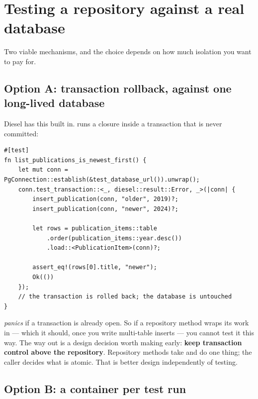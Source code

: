 \section{Testing a repository against a real database}

Two viable mechanisms, and the choice depends on how much isolation you want to pay for.

\subsection{Option A: transaction rollback, against one long-lived database}

Diesel has this built in.  runs a closure inside a transaction
that is never committed:

\begin{lstlisting}[style=rs,caption={Fast, no containers, no cleanup.}]
#[test]
fn list_publications_is_newest_first() {
    let mut conn = PgConnection::establish(&test_database_url()).unwrap();
    conn.test_transaction::<_, diesel::result::Error, _>(|conn| {
        insert_publication(conn, "older", 2019)?;
        insert_publication(conn, "newer", 2024)?;

        let rows = publication_items::table
            .order(publication_items::year.desc())
            .load::<PublicationItem>(conn)?;

        assert_eq!(rows[0].title, "newer");
        Ok(())
    });
    // the transaction is rolled back; the database is untouched
}
\end{lstlisting}

\begin{pitfall}
 \emph{panics} if a transaction is already open. So if a repository
method wraps its work in  --- which it should, once you write
multi-table inserts --- you cannot test it this way. The way out is a design decision worth making
early: \textbf{keep transaction control above the repository}. Repository methods take
 and do one thing; the caller decides what is atomic. That is better
design independently of testing.
\end{pitfall}

\subsection{Option B: a container per test run}


